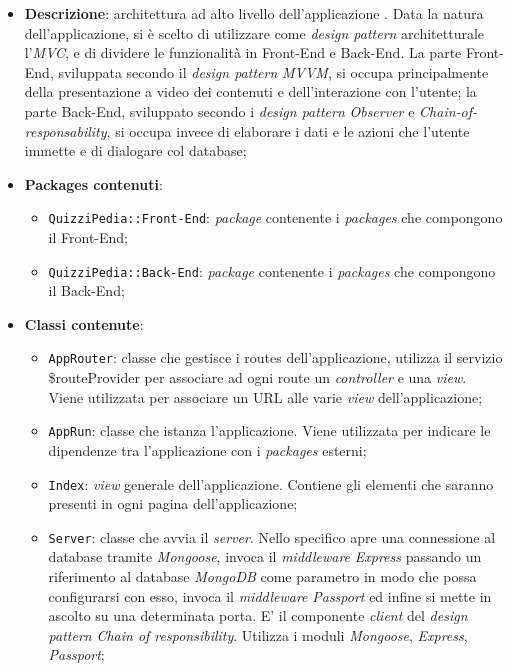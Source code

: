 \begin{itemize}
	\item \textbf{Descrizione}: architettura ad alto livello dell'applicazione \progetto. Data la natura dell'applicazione, si è scelto di utilizzare come \textit{design pattern} architetturale l'\textit{MVC}, e di dividere le funzionalità in Front-End e Back-End. La parte Front-End, sviluppata secondo il \textit{design pattern} \textit{MVVM}, si occupa principalmente della presentazione a video dei contenuti e dell'interazione con l'utente; la parte Back-End, sviluppato secondo i \textit{design pattern} \textit{Observer} e \textit{Chain-of-responsability}, si occupa invece di elaborare i dati e le azioni che l'utente immette e di dialogare col database;
	\item \textbf{Packages contenuti}:
	\begin{itemize}
		\item \texttt{QuizziPedia::Front-End}: \textit{package} contenente i \textit{packages} che compongono il Front-End;
		\item \texttt{QuizziPedia::Back-End}: \textit{package} contenente i \textit{packages} che compongono il Back-End;
	\end{itemize}
	\item \textbf{Classi contenute}:
	\begin{itemize}
		\item \texttt{AppRouter}: classe che gestisce i routes dell'applicazione, utilizza il servizio \$routeProvider per associare ad ogni route un \textit{controller} e una \textit{view}. Viene utilizzata per associare un URL alle varie \textit{view} dell'applicazione;
		\item \texttt{AppRun}: classe che istanza l'applicazione. Viene utilizzata per indicare le dipendenze tra l'applicazione con i \textit{packages} esterni;
		\item \texttt{Index}: \textit{view} generale dell'applicazione. Contiene gli elementi che saranno presenti in ogni pagina dell'applicazione;
		\item \texttt{Server}: classe che avvia il \textit{server}. Nello specifico apre una connessione al database tramite \textit{Mongoose}, invoca il \textit{middleware} \textit{Express} passando un riferimento al database \textit{MongoDB} come parametro in modo  che possa configurarsi con esso, invoca il \textit{middleware} \textit{Passport} ed infine si mette in ascolto su una determinata porta. E' il componente \textit{client} del \textit{design pattern} \textit{Chain of responsibility}. Utilizza i moduli \textit{Mongoose}, \textit{Express}, \textit{Passport};

\end{itemize}
\end{itemize}
